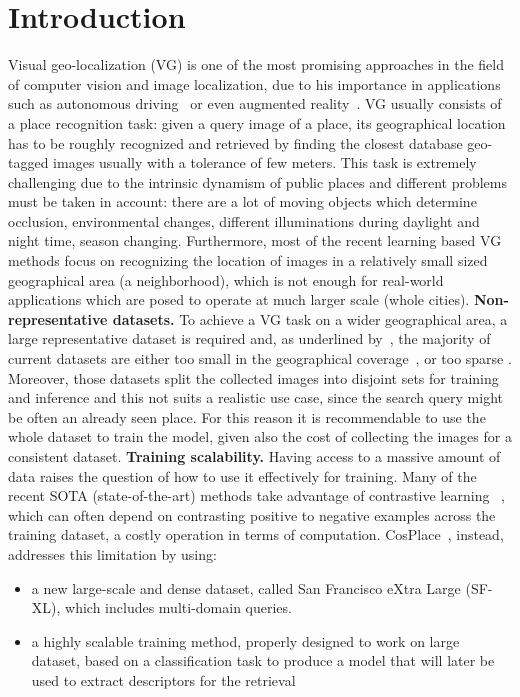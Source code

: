 \documentclass[10pt,twocolumn,letterpaper]{article}
\begin{document}
\section{Introduction}\label{sec:introduction}
Visual geo-localization (VG) is one of the most promising approaches in the field of computer vision and image localization,
due to his importance in applications such as autonomous driving~\cite{6906961} or even augmented reality~\cite{middelberg}.
VG usually consists of a place recognition task: given a query image of a place, its geographical location has to be roughly recognized and retrieved
by finding the closest database geo-tagged images usually with a tolerance of few meters. 
This task is extremely challenging due to the intrinsic dynamism of public places and different problems must be taken in account:
there are a lot of moving objects which determine occlusion, environmental changes, different illuminations during daylight and night time, season changing.
Furthermore, most of the recent learning based VG methods focus on recognizing the location of images in a relatively small sized geographical area (\eg a neighborhood), 
which is not enough for real-world applications which are posed to operate at much larger scale (\eg whole cities).
\newline
\textbf{Non-representative datasets.}
To achieve a VG task on a wider geographical area, a large representative dataset is required and, as underlined by~\cite{Berton_CVPR_2022_CosPlace}, the majority of 
current datasets are either too small in the geographical coverage~\cite{netvlad,lidards,kittids}, or too sparse \cite{oxfds, mapillary}. Moreover, those datasets split the collected images into 
disjoint sets for training and inference and this not suits a realistic use case, since the search query might be often an already seen place.
For this reason it is recommendable to use the whole dataset to train the model, given also the cost of collecting the images for a consistent dataset.
\newline
\textbf{Training scalability.}
Having access to a massive amount of data raises the question of how to use it effectively for training. Many of the recent SOTA (state-of-the-art) methods take advantage
of contrastive learning ~\cite{netvlad, adageo}, which can often depend on contrasting positive to negative examples across the training dataset, a costly operation in terms of computation. CosPlace~\cite{Berton_CVPR_2022_CosPlace}, instead, addresses this limitation by using:
\begin{itemize}
    \item a new large-scale and dense dataset, called San Francisco eXtra Large (SF-XL), which includes multi-domain queries.
    \item a highly scalable training method, properly designed to work on large dataset, based on a classification task to produce a model that will later be used to extract descriptors for the retrieval
\end{itemize}
\end{document}
